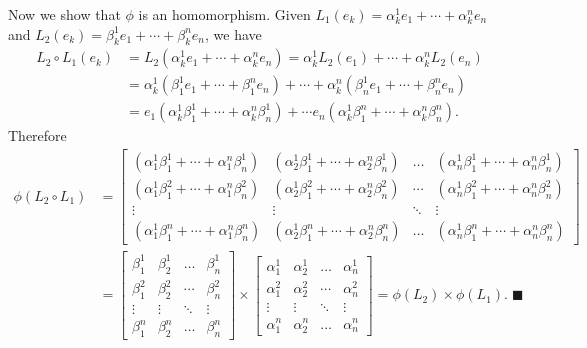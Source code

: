 \begin{proo*}
	Now we show that $\phi$ is an homomorphism. Given $L_1(e_k) = \alpha^1_ke_1 + \cdots + \alpha^n_ke_n$ and $L_2(e_k) = \beta^1_ke_1 + \cdots + \beta^n_ke_n$, we have
	\begin{align*}
	L_2 \circ L_1(e_k) &= L_2(\alpha^1_ke_1 + \cdots + \alpha^n_ke_n) = \alpha_k^1L_2(e_1) + \cdots + \alpha_k^nL_2(e_n)\\
	&= \alpha^1_k(\beta^1_1e_1 + \cdots + \beta^n_1e_n) + \cdots + \alpha^n_k(\beta^1_ne_1 + \cdots + \beta^n_ne_n)\\
	&= e_1(\alpha^1_k\beta^1_1 + \cdots + \alpha^n_k\beta^1_n) + \cdots e_n(\alpha^1_k\beta^n_1 + \cdots +\alpha^n_k\beta^n_n).
	\end{align*}
	Therefore
	\begin{align*}
		\phi(L_2 \circ L_1) &= 
		\begin{bmatrix} 
	    (\alpha^1_1\beta^1_1 + \cdots +\alpha^n_1\beta^1_n) & (\alpha^1_2\beta^1_1 + \cdots + \alpha^n_2\beta^1_n) & \dots & (\alpha^1_n\beta^1_1 + \cdots +\alpha^n_n\beta^1_n) \\
	    (\alpha^1_1\beta^2_1 + \cdots +\alpha^n_1\beta^2_n) & (\alpha^1_2\beta^2_1 + \cdots + \alpha^n_2\beta^2_n) & \cdots & (\alpha^1_n\beta^2_1 + \cdots +\alpha^n_n\beta^2_n) \\
	    \vdots & \vdots& \ddots & \vdots\\
	    (\alpha^1_1\beta^n_1 + \cdots +\alpha^n_1\beta^n_n) & (\alpha^1_2\beta^n_1 + \cdots + \alpha^n_2\beta^n_n) &\dots & (\alpha^1_n\beta^n_1 + \cdots +\alpha^n_n\beta^n_n) 
		\end{bmatrix}\\
		&= \begin{bmatrix} 
	    \beta^1_1 & \beta^1_2 & \dots & \beta^1_n \\
	    \beta^2_1 & \beta^2_2 & \cdots & \beta^2_n \\
	    \vdots & \vdots& \ddots & \vdots\\
	    \beta^n_1 & \beta^n_2  &\dots & \beta^n_n 
	\end{bmatrix} \times
\begin{bmatrix} 
	    \alpha^1_1 & \alpha^1_2 & \dots & \alpha^1_n \\
	    \alpha^2_1 & \alpha^2_2 & \cdots & \alpha^2_n \\
	    \vdots & \vdots& \ddots & \vdots\\
	    \alpha^n_1 & \alpha^n_2  &\dots & \alpha^n_n 
	\end{bmatrix}
		= \phi(L_2) \times \phi(L_1). \; \blacksquare
	\end{align*}
\end{proo*}

